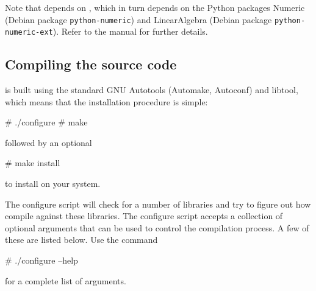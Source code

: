 Note that \ffc{} depends on \fiat{} , which in turn depends on
the Python packages Numeric (Debian package \texttt{python-numeric}) and
LinearAlgebra (Debian package \texttt{python-numeric-ext}). Refer to
the \ffc{} manual for further details.



\subsection{Compiling the source code}

\dolfin{} is built using the standard GNU Autotools (Automake,
Autoconf) and libtool, which means that the installation procedure is simple:
\begin{code}
  # ./configure
  # make
\end{code}
followed by an optional
\begin{code}
  # make install
\end{code}
to install \dolfin{} on your system.

The configure script will check for a number of libraries and try
to figure out how compile \dolfin{} against these libraries. The
configure script accepts a collection of optional arguments that can be
used to control the compilation process. A few of these are listed
below. Use the command
\begin{code}
  # ./configure --help
\end{code}
for a complete list of arguments.

